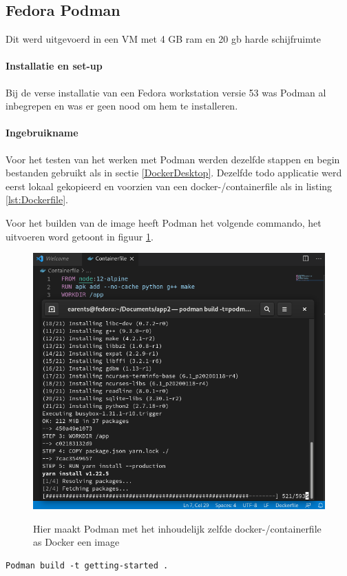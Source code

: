 \subsection{Fedora Podman}
Dit werd uitgevoerd in een VM met 4 GB ram en 20 gb harde schijfruimte
\paragraph{Installatie en set-up}
Bij de verse installatie van een Fedora workstation versie 53 was Podman al inbegrepen en was er geen nood om hem te installeren.

\paragraph{Ingebruikname}
Voor het testen van het werken met Podman werden dezelfde stappen en begin bestanden gebruikt als in sectie \ref{DockerDesktop}. Dezelfde todo applicatie werd eerst lokaal gekopieerd en voorzien van een docker-/containerfile als in listing \ref{lst:Dockerfile}.

Voor het builden van de image heeft Podman het volgende commando, het uitvoeren word getoont in figuur \ref{fig:podmanbuild}.
\begin{figure}[h]
    \includegraphics[width=\linewidth]{img/podmanbuild.png}
    \label{fig:podmanbuild}
    \caption[Met podman een containerfile builden]{Hier maakt Podman met het inhoudelijk zelfde docker-/containerfile as Docker een image}
    \centering
\end{figure}
\begin{verbatim}
Podman build -t getting-started .
\end{verbatim}
 
